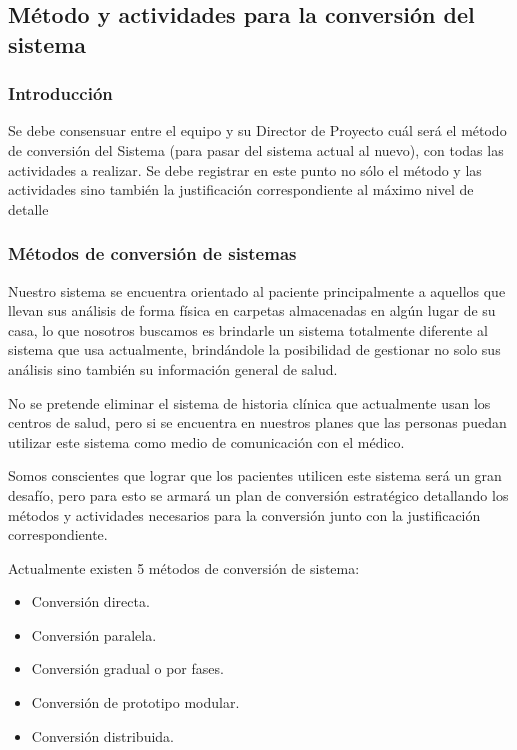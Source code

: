 \newpage

\subsection{Método y actividades para la conversión del sistema}

\subsubsection{Introducción}

Se debe consensuar entre el equipo y su Director de Proyecto cuál será el método de conversión del Sistema (para pasar del sistema actual al nuevo), con todas las actividades a realizar. Se debe registrar en este punto no sólo el método y las actividades sino también la justificación correspondiente al máximo nivel de detalle

\subsubsection{Métodos de conversión de sistemas}

Nuestro sistema se encuentra orientado al paciente principalmente a aquellos que llevan sus análisis de forma física en carpetas almacenadas en algún lugar de su casa, lo que nosotros buscamos es brindarle un sistema totalmente diferente al sistema que usa actualmente, brindándole la posibilidad de gestionar no solo sus análisis sino también su información general de salud.

No se pretende eliminar el sistema de historia clínica que actualmente usan los centros de salud, pero si se encuentra en nuestros planes que las personas puedan utilizar este sistema como medio de comunicación con el médico.

Somos conscientes que lograr que los pacientes utilicen este sistema será un gran desafío, pero para esto se armará un plan de conversión estratégico detallando los métodos y actividades necesarios para la conversión junto con la justificación correspondiente.

Actualmente  existen 5 métodos de conversión de sistema:
\begin{itemize}
\item Conversión directa.
\item Conversión paralela.
\item Conversión gradual o por fases.
\item Conversión de prototipo modular.
\item Conversión distribuida.
\end{itemize}


